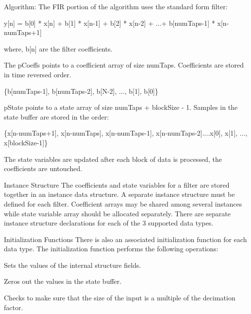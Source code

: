 \begin{DoxyParagraph}{Algorithm\-: }
The F\-I\-R portion of the algorithm uses the standard form filter\-: 
\begin{DoxyPre}   
    y[n] = b[0] * x[n] + b[1] * x[n-1] + b[2] * x[n-2] + ...+ b[numTaps-1] * x[n-numTaps+1]   
 \end{DoxyPre}
 where, {\ttfamily b\mbox{[}n\mbox{]}} are the filter coefficients. 
\end{DoxyParagraph}
\begin{DoxyParagraph}{}
The {\ttfamily p\-Coeffs} points to a coefficient array of size {\ttfamily num\-Taps}. Coefficients are stored in time reversed order. 
\end{DoxyParagraph}
\begin{DoxyParagraph}{}

\begin{DoxyPre}   
    \{b[numTaps-1], b[numTaps-2], b[N-2], ..., b[1], b[0]\}   
 \end{DoxyPre}
 
\end{DoxyParagraph}
\begin{DoxyParagraph}{}
{\ttfamily p\-State} points to a state array of size {\ttfamily num\-Taps + block\-Size -\/ 1}. Samples in the state buffer are stored in the order\-: 
\end{DoxyParagraph}
\begin{DoxyParagraph}{}

\begin{DoxyPre}   
    \{x[n-numTaps+1], x[n-numTaps], x[n-numTaps-1], x[n-numTaps-2]....x[0], x[1], ..., x[blockSize-1]\}   
 \end{DoxyPre}
 The state variables are updated after each block of data is processed, the coefficients are untouched.
\end{DoxyParagraph}
\begin{DoxyParagraph}{Instance Structure }
The coefficients and state variables for a filter are stored together in an instance data structure. A separate instance structure must be defined for each filter. Coefficient arrays may be shared among several instances while state variable array should be allocated separately. There are separate instance structure declarations for each of the 3 supported data types.
\end{DoxyParagraph}
\begin{DoxyParagraph}{Initialization Functions }
There is also an associated initialization function for each data type. The initialization function performs the following operations\-:
\begin{DoxyItemize}
\item Sets the values of the internal structure fields.
\item Zeros out the values in the state buffer.
\item Checks to make sure that the size of the input is a multiple of the decimation factor.
\end{DoxyItemize}
\end{DoxyParagraph}
